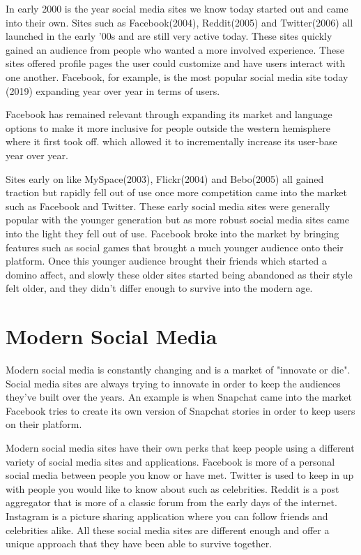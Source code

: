 In early 2000 is the year social media sites we know today started out and came into their own. Sites such as Facebook(2004), Reddit(2005) and Twitter(2006) all launched in the early '00s and are still very active today. These sites quickly gained an audience from people who wanted a more involved experience. These sites offered profile pages the user could customize and have users interact with one another. Facebook, for example, is the most popular social media site today (2019) expanding year over year in terms of users. 

Facebook has remained relevant through expanding its market and language options to make it more inclusive for people outside the western hemisphere where it first took off. which allowed it to incrementally increase its user-base year over year.

Sites early on like MySpace(2003), Flickr(2004) and Bebo(2005) all gained traction but rapidly fell out of use once more competition came into the market such as Facebook and Twitter. These early social media sites were generally popular with the younger generation but as more robust social media sites came into the light they fell out of use. Facebook broke into the market by bringing features such as social games that brought a much younger audience onto their platform. Once this younger audience brought their friends which started a domino affect, and slowly these older sites started being abandoned as their style felt older, and they didn't differ enough to survive into the modern age.

\section{Modern Social Media}
Modern social media is constantly changing and is a market of "innovate or die". Social media sites are always trying to innovate in order to keep the audiences they've built over the years. An example is when Snapchat came into the market Facebook tries to create its own version of Snapchat stories in order to keep users on their platform.

Modern social media sites have their own perks that keep people using a different variety of social media sites and applications. Facebook is more of a personal social media between people you know or have met. Twitter is used to keep in up with people you would like to know about such as celebrities. Reddit is a post aggregator that is more of a classic forum from the early days of the internet. Instagram is a picture sharing application where you can follow friends and celebrities alike. All these social media sites are different enough and offer a unique approach that they have been able to survive together. 

